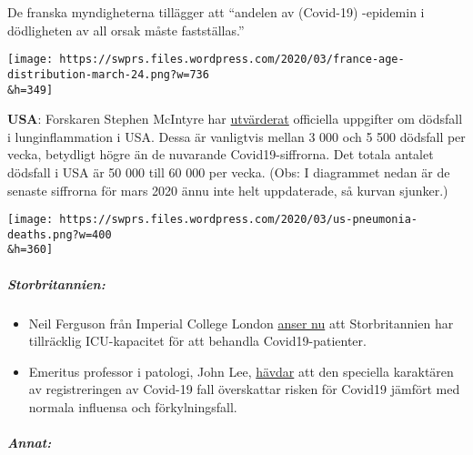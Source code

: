 De franska myndigheterna tillägger att ``andelen av (Covid-19) -epidemin
i dödligheten av all orsak måste fastställas.''

\texttt{[image: https://swprs.files.wordpress.com/2020/03/france-age-distribution-march-24.png?w=736\\\&h=349]}

\textbf{USA}: Forskaren Stephen McIntyre har
\href{https://twitter.com/ClimateAudit/status/1243019315462516736}{utvärderat}
officiella uppgifter om dödsfall i lunginflammation i USA. Dessa är
vanligtvis mellan 3 000 och 5 500 dödsfall per vecka, betydligt högre än
de nuvarande Covid19-siffrorna. Det totala antalet dödsfall i USA är 50
000 till 60 000 per vecka. (Obs: I diagrammet nedan är de senaste
siffrorna för mars 2020 ännu inte helt uppdaterade, så kurvan sjunker.)

\texttt{[image: https://swprs.files.wordpress.com/2020/03/us-pneumonia-deaths.png?w=400\\\&h=360]}

\hypertarget{storbritannien}{%
\subparagraph{\texorpdfstring{\textbf{Storbritannien}:}{Storbritannien:}}\label{storbritannien}}

\begin{itemize}
\tightlist
\item
  Neil Ferguson från Imperial College London
  \href{https://www.newscientist.com/article/2238578-uk-has-enough-intensive-care-units-for-coronavirus-expert-predicts/}{anser
  nu} att Storbritannien har tillräcklig ICU-kapacitet för att behandla
  Covid19-patienter.
\item
  Emeritus professor i patologi, John Lee,
  \href{https://www.spectator.co.uk/article/The-evidence-on-Covid-19-is-not-as-clear-as-we-think}{hävdar}
  att den speciella karaktären av registreringen av Covid-19 fall
  överskattar risken för Covid19 jämfört med normala influensa och
  förkylningsfall.
\end{itemize}

\hypertarget{annat}{%
\subparagraph{\texorpdfstring{\textbf{Annat}:}{Annat:}}\label{annat}}

